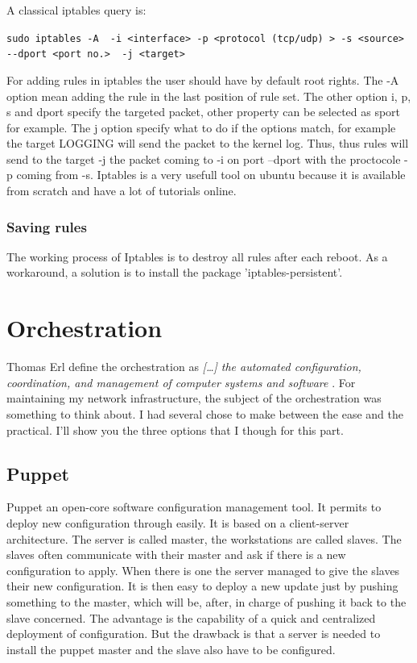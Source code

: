 \documentclass{tnreport}
\begin{document}
A classical iptables query is: 
\begin{center}\lstinline|sudo iptables -A  -i <interface> -p <protocol (tcp/udp) > -s <source> --dport <port no.>  -j <target>|\end{center}
For adding rules in iptables the user should have by default root rights. The -A option mean adding the rule in the last position of rule set. The other option i, p, s and dport specify the targeted packet, other property can be selected as sport for example. The j option specify what to do if the options match, for example the target LOGGING will send the packet to the kernel log. Thus, thus rules will send to the target -j  the packet coming to -i on port --dport with the proctocole -p coming from -s.
\eol Iptables is a very usefull tool on ubuntu because it is available from scratch and have a lot of tutorials online.

\subsubsection{Saving rules}
The working process of Iptables is to destroy all rules after each reboot. As a workaround, a solution is to install the package 'iptables-persistent'. 

\section{Orchestration}
Thomas Erl define the orchestration as \textit{[\ldots] the automated configuration, coordination, and management of computer systems and software} \cite{lib19}. For maintaining my network infrastructure, the subject of the orchestration was something to think about. I had several chose to make between the ease and the practical. I'll show you the three options that I though for this part.
\subsection{Puppet}
Puppet an open-core software configuration management tool. It permits to deploy new configuration through easily. It is based on a client-server architecture. The server is called master, the workstations are called slaves. The slaves often communicate with their master and ask if there is a new configuration to apply. When there is one the server managed to give the slaves their new configuration. It is then easy to deploy a new update just by pushing something to the master, which will be, after, in charge of pushing it back to the slave concerned.
The advantage is the capability of a quick and centralized deployment of configuration. But the drawback is that a server is needed to install the puppet master and the slave also have to be configured.
\end{document}
